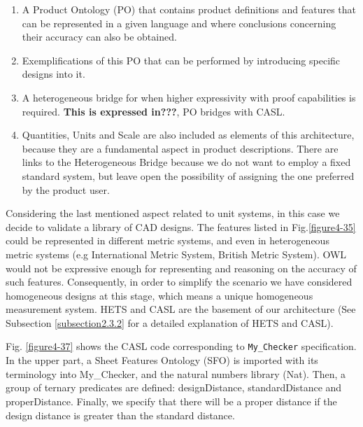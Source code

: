 \begin{enumerate}

\item A Product Ontology (PO) that contains product definitions and features that can be represented in a given language and where conclusions concerning their accuracy can also be obtained.  

\item Exemplifications of this PO that can be performed by introducing specific designs into it.  

\item A heterogeneous bridge for when higher expressivity with proof capabilities is required. \textbf{This is expressed in???},  PO bridges with CASL. 

\item Quantities, Units and Scale are also included as elements of this architecture, because they are a fundamental aspect in product descriptions. There are links to the Heterogeneous Bridge because we do not want to employ a fixed standard system, but leave open the possibility of assigning the one preferred by the product user.  

\end{enumerate}



Considering the last mentioned aspect related to unit systems, in this case we decide to validate a library of CAD designs. The features listed in Fig.\ref{figure4-35} could be represented in different metric systems, and even in heterogeneous metric systems (e.g International Metric System, British Metric System). OWL would not be expressive enough for representing and reasoning on the accuracy of such features. Consequently, in order to simplify the scenario we have considered homogeneous designs at this stage, which means a unique homogeneous measurement system. \cbstart HETS and CASL are the basement of our architecture (See Subsection \ref{subsection2.3.2} for a detailed explanation of HETS and CASL). \cbend

Fig. \ref{figure4-37} shows the CASL code corresponding to \texttt{My\_Checker} specification. In the upper part, a Sheet Features Ontology (SFO) is imported with its terminology into My\_Checker, and    the natural numbers library (Nat). Then, a group of ternary predicates are defined: designDistance, standardDistance and properDistance. Finally, we specify that there will be a proper distance if the design distance is greater than the standard distance.

